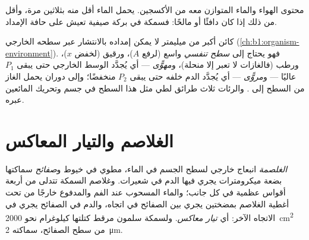 \begin{omfigure}

{\small محتوى الهواء والماء المتوازن معه من الأكسجين. يحمل الماء
أقل منه بثلاثين مرة، وأقل من ذلك إذا كان دافئًا أو مالحًا: فسمكة في
بركة صيفية تعيش على حافة الإمداد.}
\end{omfigure}

\begin{proposition}\label{prop:b1:gas-exchange:requirements}
كائن أكبر من ميليمتر لا يمكن إمداده بالانتشار عبر سطحه الخارجي
(\cref{ch:b1:organism-environment}). فهو يحتاج إلى \emph{سطح
تنفسي} واسع (لرفع $A$)، ورقيق (لخفض $x$)، ورطب (فالغازات لا تعبر
 إلا منحلة)، و\emph{مهوًّى} --- أي يُجدَّد الوسط الخارجي حتى
يبقى $P_1$ عاليًا --- و\emph{مروًّى} --- أي يُجدَّد الدم خلفه حتى يبقى
$P_2$ منخفضًا؛ وإلى دوران يحمل الغاز من السطح إلى .
 والرئات  ثلاث طرائق لطي مثل هذا السطح في
جسم وتحريك المائعين عبره.
\end{proposition}

\section{الغلاصم والتيار المعاكس}

\begin{definition}[الغلصمة]\label{def:b1:gas-exchange:gill}
\emph{الغلصمة} انبعاج خارجي لسطح الجسم في الماء، مطوي في خيوط
و\emph{صفائح} سماكتها بضعة ميكرومترات يجري فيها الدم في شعيرات.
وغلاصم السمكة تتدلى من أربعة أقواس عظمية في كل جانب؛ والماء
المسحوب عند الفم والمدفوع خارجًا من تحت أغطية الغلاصم بمضختين يجري
بين الصفائح في اتجاه، والدم في الصفائح يجري في الاتجاه الآخر: أي
\emph{تيار معاكس}. ولسمكة سلمون مرقط
كتلتها كيلوغرام نحو \qty{2000}{cm^2} من سطح الصفائح، سماكته
\qty{2}{\micro m}.
\end{definition}

